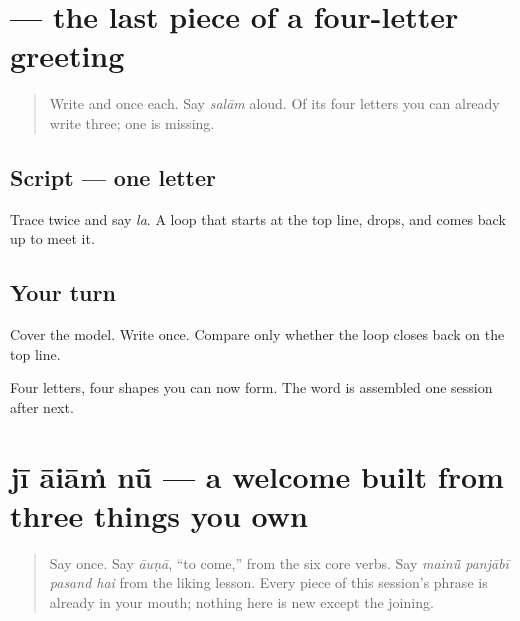 \section[\texorpdfstring{\pa{ਲ} (la)}{ਲ (la)}]{ — the last piece of a four-letter greeting}

\label{lesson:PA-W09-lalla}



\begin{quote}
Write \textbf{} and \textbf{} once each. Say \emph{salām} aloud. Of its four letters you can already write three; one is missing.
\end{quote}

\subsection*{Script — one letter}

Trace \textbf{} twice and say \emph{la}. A loop that starts at the top line, drops, and comes back up to meet it.

\subsection*{Your turn}
Cover the model. Write \textbf{} once. Compare only whether the loop closes back on the top line.

\begin{tcolorbox}[breakable,colback=teal!4,colframe=teal!35!black,title={Before you move on}]
Four letters, four shapes you can now form. The word is assembled one session after next.
\end{tcolorbox}
\section[\texorpdfstring{\pa{ਜੀ} \pa{ਆਇਆਂ} \pa{ਨੂੰ} (jī āiāṁ nū̃)}{ਜੀ ਆਇਆਂ ਨੂੰ (jī āiāṁ nū̃)}]{jī āiāṁ nū̃ — a welcome built from three things you own}

\label{lesson:PA-C34-ji-aaian-nu}



\begin{quote}
Say \textbf{} once. Say \emph{āuṇā}, \textquotedblleft{}to come,\textquotedblright{} from the six core verbs. Say \emph{mainū̃ panjābī pasand hai} from the liking lesson. Every piece of this session's phrase is already in your mouth; nothing here is new except the joining.
\end{quote}

